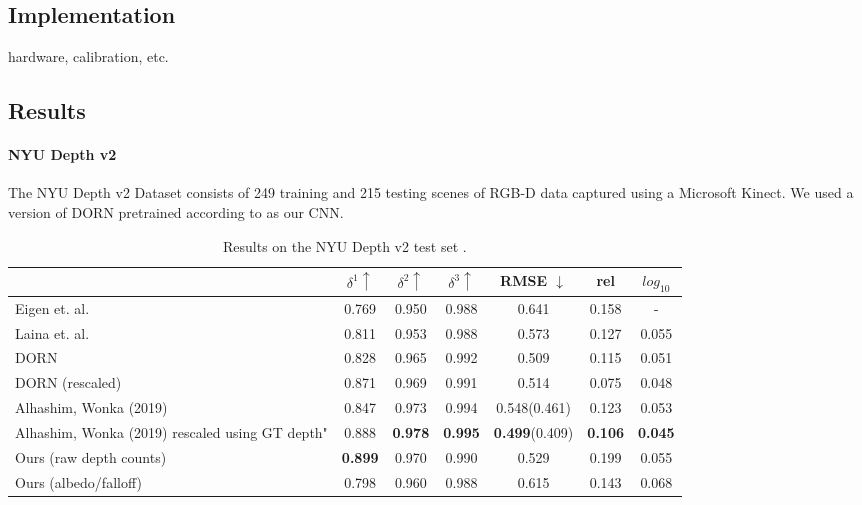 \subsection{Implementation} 

hardware, calibration, etc.

\subsection{Results} 
\paragraph{NYU Depth v2}
The NYU Depth v2 Dataset consists of 249 training and 215 testing scenes of
RGB-D data captured using a Microsoft Kinect. We used a version of DORN
pretrained according to \cite{Fu. et al} as our CNN.
\newpage
\begin{table*}
\begin{center}
\begin{tabular}{lccc|ccc}
  \toprule
    & $\delta^1 \uparrow$ & $\delta^2\uparrow$ & $\delta^3 \uparrow$ & RMSE $\downarrow$ & rel & $log_{10}$ \\
  \midrule
Eigen et. al. & 0.769 & 0.950 & 0.988 & 0.641 & 0.158 & - \\ 
Laina et. al.&0.811&0.953&0.988&0.573&0.127&0.055 \\
DORN&0.828&0.965&0.992&0.509&0.115&0.051 \\
  DORN (rescaled) & 0.871 & 0.969 & 0.991 & 0.514 & 0.075 & 0.048 \\
Alhashim, Wonka (2019)&0.847&0.973&0.994&0.548(0.461)&0.123&0.053 \\
Alhashim, Wonka (2019) rescaled using GT depth"&0.888&\textbf{0.978}&\textbf{0.995}&\textbf{0.499}(0.409)&\textbf{0.106}&\textbf{0.045} \\
  \midrule
  Ours (raw depth counts) & \textbf{0.899} & 0.970 & 0.990 & 0.529 & 0.199 & 0.055 \\
  Ours (albedo/falloff) & 0.798 & 0.960 & 0.988 & 0.615 & 0.143 & 0.068 \\
  \bottomrule
\end{tabular} 
\end{center}
\caption{Results on the NYU Depth v2 test set \cite{nyudepth}.}
\end{table*}

